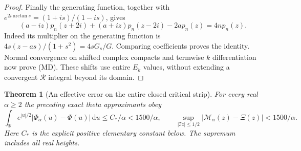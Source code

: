 \documentclass[11pt]{article}
\newtheorem{theorem}{Theorem}
\theoremstyle{remark}\newtheorem{remark}[theorem]{Remark}
\newcommand{\R}{\mathbb R}
\newcommand{\dd}{\,\mathrm d}
\begin{document}
\begin{proof}
Finally the generating function, together with
$e^{2i\arctan s}=(1+is)/(1-is)$, gives
\[
 (a-iz)p_n(z+2i)+(a+iz)p_n(z-2i)-2ap_n(z)=4np_n(z).
\]
Indeed its multiplier on the generating function is
$4s(z-as)/(1+s^2)=4sG_s/G$. Comparing coefficients proves the
identity. Normal convergence on shifted complex compacts and termwise
$k$ differentiation now prove (MD). These shifts use entire $E_k$
values, without extending a convergent $\mathcal R$ integral beyond
its domain.
\end{proof}

\begin{theorem}[An effective error on the entire closed critical strip]
\label{thm:mehler-effective-error}
For every real $\alpha\ge2$ the preceding exact theta approximants obey
\[
 \int_\R e^{|u|/2}|\Phi_\alpha(u)-\Phi(u)|\dd u
 \le C_*/\alpha<1500/\alpha,\qquad
 \sup_{|\Im z|\le1/2}|\mathcal M_\alpha(z)-\Xi(z)|<1500/\alpha.
 \tag{MEB}
\]
Here $C_*$ is the explicit positive elementary constant below.
The supremum includes all real heights.
\end{theorem}
\end{document}

